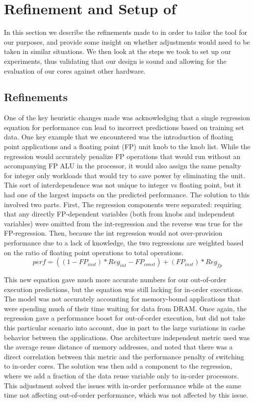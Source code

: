 \section{Refinement and Setup of \blackBox{}}
\label{sec:validation}
In this section we describe the refinements made to \blackBox{} in order
to tailor the tool for our purposes, and provide some insight on whether
adjustments would need to be taken in similar situations. We then look at 
the steps we took to set up our experiments, thus validating that our design 
is sound and allowing for the evaluation of our \Ravan{} cores against other hardware. 

\subsection{Refinements}
\label{sec:refinements}
One of the key heuristic changes made was acknowledging that a single regression
equation for performance can lead to incorrect predictions based on training 
set data. One key example that we encountered was the introduction of floating 
point applications and a floating point (FP) unit knob to the knob list. While 
the regression would accurately penalize FP operations that would run without
an accompanying FP ALU in the processor, it would also assign the same penalty 
for integer only workloads that would try to save power by eliminating the
unit. This sort of interdependence was not unique to integer vs floating point,
but it had one of the largest impacts on the predicted performance. The solution 
to this involved two parts. First, The regression components were separated: 
requiring that any directly FP-dependent variables (both from knobs and 
independent variables) were omitted from the int-regression and the reverse was
true for the FP-regression. Then, because the int regression would not over-provision
performance due to a lack of knowledge, the two regressions are weighted based on
the ratio of floating point operations to total operations.
\begin{equation}
perf = ((1-FP_{inst})*Reg_{int} - FP_{const})+ (FP_{inst})*Reg_{fp}
\end{equation}

This new equation gave much more accurate numbers for our out-of-order execution
predictions, but the equation was still lacking for in-order executions. The model 
was not accurately accounting for memory-bound applications that were
spending much of their time waiting for data from DRAM. Once again, the regression
gave a performance boost for out-of-order execution, but did not take this 
particular scenario into account, due in part to the large variations in cache
behavior between the applications. One architecture independent metric used
was the average reuse distance of memory addresses, and noted that there was
a direct correlation between this metric and the performance penalty of 
switching to in-order cores. The solution was then add a component to the regression,
where we add a fraction of the data reuse variable only to in-order processors. 
This adjustment solved the issues with in-order performance while at the same
time not affecting out-of-order performance, which was not affected by this issue.

